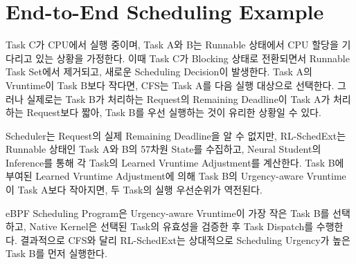 \section{End-to-End Scheduling Example}
\label{sec:impl-end-to-end-scheduling-example}
Task C가 CPU에서 실행 중이며, Task A와 B는
Runnable 상태에서 CPU 할당을 기다리고 있는 상황을 가정한다.
이때 Task C가 Blocking 상태로 전환되면서
Runnable Task Set에서 제거되고,
새로운 Scheduling Decision이 발생한다.
Task A의 Vruntime이 Task B보다 작다면,
CFS는 Task A를 다음 실행 대상으로 선택한다.
그러나 실제로는 Task B가 처리하는 Request의 Remaining Deadline이
Task A가 처리하는 Request보다 짧아, Task B를 우선 실행하는 것이
유리한 상황일 수 있다.

Scheduler는 Request의 실제 Remaining Deadline을 알 수 없지만,
RL-SchedExt는 Runnable 상태인 Task A와 B의
57차원 State를 수집하고, Neural Student의 Inference를 통해
각 Task의 Learned Vruntime Adjustment를 계산한다.
Task B에 부여된 Learned Vruntime Adjustment에 의해
Task B의 Urgency-aware Vruntime이 Task A보다 작아지면,
두 Task의 실행 우선순위가 역전된다.

eBPF Scheduling Program은 Urgency-aware Vruntime이 가장 작은
Task B를 선택하고, Native Kernel은 선택된 Task의
유효성을 검증한 후 Task Dispatch를 수행한다.
결과적으로 CFS와 달리 RL-SchedExt는 상대적으로
Scheduling Urgency가 높은 Task B를 먼저 실행한다.

